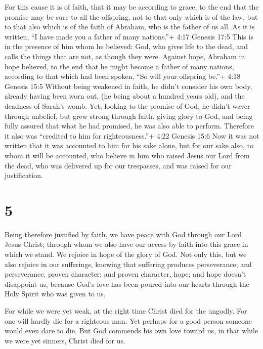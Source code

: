  For this cause it is of faith, that it may be according to
grace, to the end that the promise may be sure to all the offspring, not
to that only which is of the law, but to that also which is of the faith
of Abraham, who is the father of us all.  As it is written,
``I have made you a father of many nations.''+ 4:17 Genesis 17:5 This is
in the presence of him whom he believed: God, who gives life to the
dead, and calls the things that are not, as though they were.
 Against hope, Abraham in hope believed, to the end that he
might become a father of many nations, according to that which had been
spoken, ``So will your offspring be.''+ 4:18 Genesis 15:5 
Without being weakened in faith, he didn't consider his own body,
already having been worn out, (he being about a hundred years old), and
the deadness of Sarah's womb.  Yet, looking to the promise
of God, he didn't waver through unbelief, but grew strong through faith,
giving glory to God,  and being fully assured that what he
had promised, he was also able to perform.  Therefore it
also was ``credited to him for righteousness.''+ 4:22 Genesis 15:6
 Now it was not written that it was accounted to him for
his sake alone,  but for our sake also, to whom it will be
accounted, who believe in him who raised Jesus our Lord from the dead,
 who was delivered up for our trespasses, and was raised
for our justification.

\hypertarget{section-4}{%
\section{5}\label{section-4}}

 Being therefore justified by faith, we have peace with God
through our Lord Jesus Christ;  through whom we also have
our access by faith into this grace in which we stand. We rejoice in
hope of the glory of God.  Not only this, but we also
rejoice in our sufferings, knowing that suffering produces perseverance;
 and perseverance, proven character; and proven character,
hope;  and hope doesn't disappoint us, because God's love
has been poured into our hearts through the Holy Spirit who was given to
us.

 For while we were yet weak, at the right time Christ died
for the ungodly.  For one will hardly die for a righteous
man. Yet perhaps for a good person someone would even dare to die.
 But God commends his own love toward us, in that while we
were yet sinners, Christ died for us.

